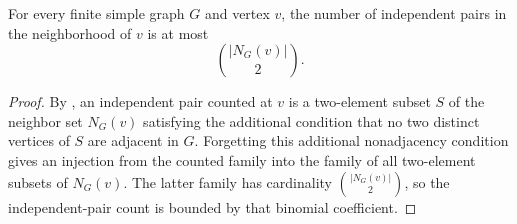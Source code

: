 \begin{helper}
For every finite simple graph $G$ and vertex $v$, the number of independent
pairs in the neighborhood of $v$ is at most
\[
\binom{|N_G(v)|}{2}.
\]
\end{helper}
\begin{proof}
By , an independent pair counted at $v$ is a
two-element subset $S$ of the neighbor set $N_G(v)$ satisfying the additional
condition that no two distinct vertices of $S$ are adjacent in $G$.  Forgetting
this additional nonadjacency condition gives an injection from the counted
family into the family of all two-element subsets of $N_G(v)$.  The latter
family has cardinality $\binom{|N_G(v)|}{2}$, so the independent-pair count is
bounded by that binomial coefficient.
\end{proof}
